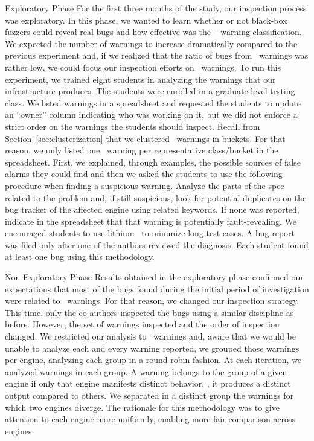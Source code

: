 \documentclass[smallextended]{svjour3}
\begin{document}
\vspace{0.5ex} \lbrack{}Exploratory Phase\rbrack{} For the first
three months of the study, our inspection process was exploratory.  In
this phase, we wanted to learn whether or not black-box fuzzers could
reveal real bugs and how effective was the \hi{}-\lo\ warning
classification.  We expected the number of warnings to increase
dramatically compared to the previous experiment and, if we realized
that the ratio of bugs from \lo\ warnings was rather low, we could
focus our inspection efforts on \hi\ warnings. To run this experiment,
we trained eight students in analyzing the warnings that our
infrastructure produces. The students were enrolled in a
graduate-level testing class. We listed warnings in a spreadsheet and
requested the students to update an ``owner'' column indicating who
was working on it, but we did not enforce a strict order on the
warnings the students should inspect. Recall from
Section~\ref{sec:clusterization} that we clustered \lo\ warnings in
buckets. For that reason, we only listed one \lo\ warning per
representative class/bucket in the spreadsheet. First, we explained,
through examples, the possible sources of false alarms they could find
and then we asked the students to use the following procedure when
finding a suspicious warning. Analyze the parts of the spec related to
the problem and, if still suspicious, look for potential duplicates on
the bug tracker of the affected engine using related keywords. If none
was reported, indicate in the spreadsheet that that warning is
potentially fault-revealing. We encouraged students to use
lithium~\cite{lithium} to minimize long test cases. A bug report
was filed only after one of the authors reviewed the diagnosis. Each
student found at least one bug using this methodology.

\vspace{0.5ex}
\lbrack{}Non-Exploratory Phase\rbrack{} Results obtained in the
exploratory phase confirmed our expectations that most of the bugs
found during the initial period of investigation were related to
\hi\ warnings. For that reason, we changed our inspection
strategy. This time, only the co-authors inspected the bugs using a
similar discipline as before. However, the set of warnings inspected
and the order of inspection changed. We restricted our analysis to
\hi\ warnings and, aware that we would be unable to analyze each and
every warning reported, we grouped those warnings per engine,
analyzing each group in a round-robin fashion.  At each iteration, we
analyzed \warningsIteration{} warnings in each group. A warning
belongs to the group of a given engine if only that engine manifests
distinct behavior, \ie{}, it produces a distinct output compared to
others. We separated in a distinct group the warnings for which two
engines diverge. The rationale for this methodology was to give
attention to each engine more uniformly, enabling more fair comparison
across engines.
\end{document}
